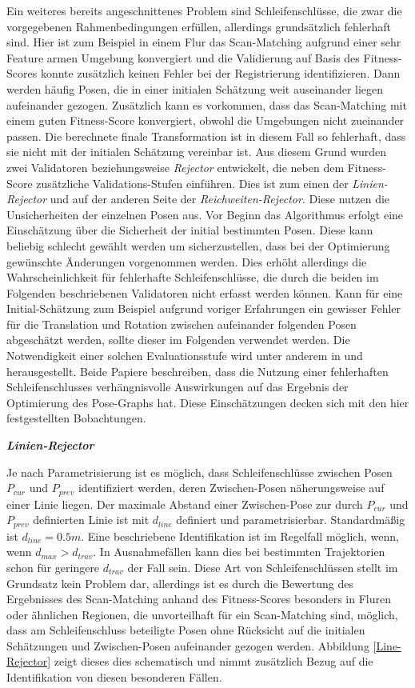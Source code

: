 Ein weiteres bereits angeschnittenes Problem sind Schleifenschlüsse, die zwar die vorgegebenen Rahmenbedingungen erfüllen, allerdings grundsätzlich fehlerhaft sind. Hier ist zum Beispiel in einem Flur das Scan-Matching aufgrund einer sehr Feature armen Umgebung konvergiert und die Validierung auf Basis des Fitness-Scores konnte zusätzlich keinen Fehler bei der Registrierung identifizieren. Dann werden häufig Posen, die in einer initialen Schätzung weit auseinander liegen aufeinander gezogen. Zusätzlich kann es vorkommen, dass das Scan-Matching mit einem guten Fitness-Score konvergiert, obwohl die Umgebungen nicht zueinander passen. Die berechnete finale Transformation ist in diesem Fall so fehlerhaft, dass sie nicht mit der initialen Schätzung vereinbar ist. Aus diesem Grund wurden zwei Validatoren beziehungsweise \emph{Rejector} entwickelt, die neben dem Fitness-Score zusätzliche Validations-Stufen einführen. Dies ist zum einen der \emph{Linien-Rejector} und auf  der anderen Seite der \emph{Reichweiten-Rejector}. Diese nutzen die Unsicherheiten der einzelnen Posen aus. Vor Beginn das Algorithmus erfolgt eine Einschätzung über die Sicherheit der initial bestimmten Posen. Diese kann beliebig schlecht gewählt werden um sicherzustellen, dass bei der Optimierung gewünschte Änderungen vorgenommen werden. Dies erhöht allerdings die Wahrscheinlichkeit für fehlerhafte Schleifenschlüsse, die durch die beiden im Folgenden beschriebenen Validatoren nicht erfasst werden können. Kann für eine Initial-Schätzung zum Beispiel aufgrund voriger Erfahrungen ein gewisser Fehler für die Translation und Rotation zwischen aufeinander folgenden Posen abgeschätzt werden, sollte dieser im Folgenden verwendet werden. Die Notwendigkeit einer solchen Evaluationsstufe wird unter anderem in \cite{tsintotas2022revisiting} und \cite{xie2017graphtinker} herausgestellt. Beide Papiere beschreiben, dass die Nutzung einer fehlerhaften Schleifenschlusses verhängnisvolle Auswirkungen auf das Ergebnis der Optimierung des Pose-Graphs hat. Diese Einschätzungen decken sich mit den hier festgestellten Bobachtungen.

\textbf{\textsl{Linien-Rejector}}

Je nach Parametrisierung ist es möglich, dass Schleifenschlüsse zwischen Posen $P_{cur}$ und $P_{prev}$ identifiziert werden, deren Zwischen-Posen näherungsweise auf einer Linie liegen. Der maximale Abstand einer Zwischen-Pose zur durch $P_{cur}$ und $P_{prev}$ definierten Linie ist mit $d_{line}$ definiert und parametrisierbar. Standardmäßig ist $d_{line} = 0.5m$. Eine beschriebene Identifikation ist im Regelfall möglich, wenn, wenn $d_{max} > d_{trav}$. In Ausnahmefällen kann dies bei bestimmten Trajektorien schon für geringere $d_{trav}$ der Fall sein. Diese Art von Schleifenschlüssen stellt im Grundsatz kein Problem dar, allerdings ist es durch die Bewertung des Ergebnisses des Scan-Matching anhand des Fitness-Scores besonders in Fluren oder ähnlichen Regionen, die unvorteilhaft für ein Scan-Matching sind, möglich, dass am Schleifenschluss beteiligte Posen ohne Rücksicht auf die initialen Schätzungen und Zwischen-Posen aufeinander gezogen werden. Abbildung \ref{Line-Rejector} zeigt dieses dies schematisch und nimmt zusätzlich Bezug auf die Identifikation von diesen besonderen Fällen.

